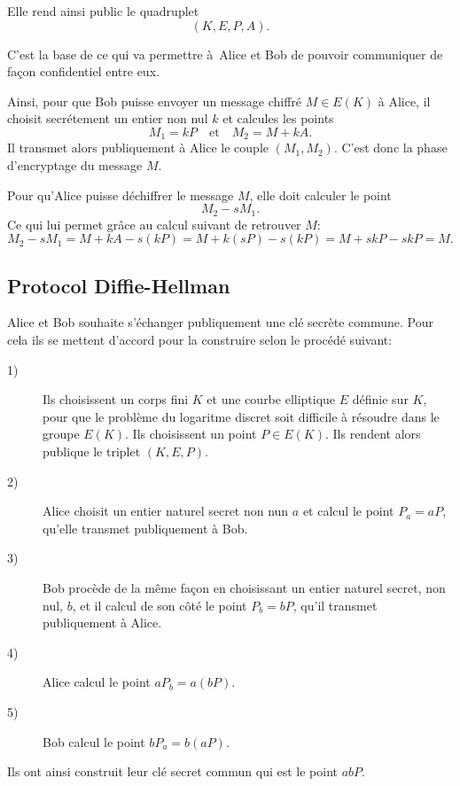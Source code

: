 Elle rend ainsi public le quadruplet 
\[
    (K,E,P,A)
.\] 

C'est la base de ce qui va permettre à Alice et Bob de pouvoir communiquer de façon confidentiel entre eux.

Ainsi, pour que Bob puisse envoyer un message chiffré $M \in E(K)$ à Alice, il choisit secrétement un entier non nul $k$ et calcules les points
\[
M_1=kP \quad \text{et} \quad M_2=M+kA
.\] 
Il transmet alors publiquement à Alice le couple $(M_1,M_2)$. C'est donc la phase d'encryptage du message $M$.

Pour qu'Alice puisse déchiffrer le message $M$, elle doit calculer le point
\[
M_2-sM_1
.\] 
Ce qui lui permet grâce au calcul suivant de retrouver $M$:
\[
M_2-sM_1=M+kA-s(kP)=M+k(sP)-s(kP)=M+skP-skP=M
.\] 

\subsection{Protocol Diffie-Hellman}

Alice et Bob souhaite s'échanger publiquement une clé secrète commune. Pour cela ils se mettent d'accord pour la construire selon le procédé suivant:

\begin{description}
    \item[1)] Ils choisissent un corps fini $K$ et une courbe elliptique $E$ définie sur $K$, pour que le problème du logaritme discret soit difficile à résoudre dans le groupe $E(K)$. Ils choisissent un point $P \in E(K)$. Ils rendent alors publique le triplet $(K,E,P)$.

    \item[2)] Alice choisit un entier naturel secret non nun $a$ et calcul le point $P_a=aP$, qu'elle transmet publiquement à Bob.

    \item[3)] Bob procède de la même façon en choisissant un entier naturel secret, non nul, $b$, et il calcul de son côté le point $P_b=bP$, qu'il transmet publiquement à Alice.

    \item[4)] Alice calcul le point $aP_b=a(bP)$.

    \item[5)] Bob calcul le point $bP_a=b(aP)$.
\end{description}

Ils ont ainsi construit leur clé secret commun qui est le point $abP$.

